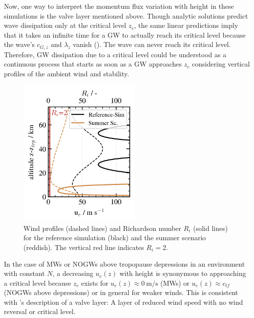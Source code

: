 Now, one way to interpret the momentum flux variation with height in these simulations is the valve layer mentioned above. Though analytic solutions predict wave dissipation only at the critical level $z_c$, the same linear predictions imply that it takes an infinite time for a GW to actually reach its critical level because the wave's $c_{G,z}$ and $\lambda_z$ vanish (\cite[]{lin_mesoscale_2007}). The wave can never reach its critical level. Therefore, GW dissipation due to a critical level could be understood as a continuous process that starts as soon as a GW approaches $z_c$ considering vertical profiles of the ambient wind and stability.
\begin{figure}
    \includegraphics[width=6cm]{figures_q3D/critical-layer-ana.png}
    \caption{Wind profiles (dashed lines) and Richardson number $R_i$ (solid lines) for the reference simulation (black) and the summer scenario (reddish). The vertical red line indicates $R_i=2$.}
    \label{fig:ri}
\end{figure}
In the case of MWs or NOGWs above tropopause depressions in an environment with constant $N$, a decreasing $u_e(z)$ with height is synonymous to approaching a critical level because $z_c$ exists for $u_e(z) \approx \SI{0}{\meter\per\second}$ (MWs) or $u_e(z) \approx c_{tf}$ (NOGWs above depressions) or in general for weaker winds. This is consistent with \textcite[]{kruse_midlatitude_2016}'s description of a valve layer: A layer of reduced wind speed with no wind reversal or critical level.\\
